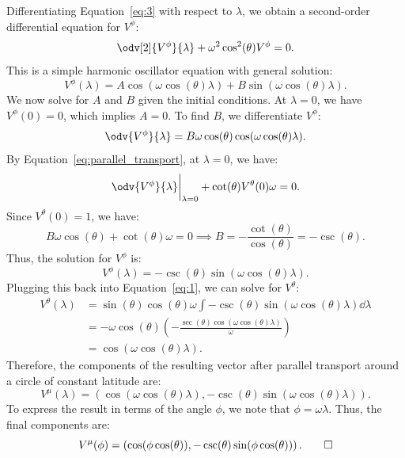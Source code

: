 \begin{solution}[(ii)]
\begin{equation}
  \end{equation}
  Differentiating Equation~\eqref{eq:3} with respect to $\lambda$, we obtain a second-order differential equation for $V^\phi$:
  \[%
    \odv[2]{V^\phi}{\lambda} + \omega^2\cos^2(\theta) V^\phi = 0
  .\]%
  This is a simple harmonic oscillator equation with general solution:
  \[%
    V^\phi(\lambda) = A \cos(\omega \cos(\theta) \lambda) + B \sin(\omega \cos(\theta) \lambda)
  .\]%
  We now solve for $A$ and $B$ given the initial conditions. At $\lambda = 0$, we have $V^\phi(0) = 0$, which implies $A = 0$. To find $B$, we differentiate $V^\phi$:
  \[%
    \odv{V^\phi}{\lambda} = B \omega \cos(\theta) \cos(\omega \cos(\theta) \lambda)
  .\]%
  By Equation~\eqref{eq:parallel_transport}, at $\lambda = 0$, we have:
  \[%
    \odv{V^\phi}{\lambda}\bigg|_{\lambda=0} + \cot(\theta) V^\theta(0) \omega = 0
  .\]%
  Since $V^\theta(0) = 1$, we have:
  \[%
    B \omega \cos(\theta) + \cot(\theta) \omega = 0 \implies B = -\frac{\cot(\theta)}{\cos(\theta)} = -\csc(\theta)
  .\]%
  Thus, the solution for $V^\phi$ is:
  \[%
    V^\phi(\lambda) = -\csc(\theta) \sin(\omega \cos(\theta) \lambda)
  .\]%
  Plugging this back into Equation~\eqref{eq:1}, we can solve for $V^\theta$:
  \begin{align*}
    V^\theta(\lambda) &= \sin(\theta)\cos(\theta) \omega \int -\csc(\theta) \sin(\omega \cos(\theta) \lambda) \dd{\lambda} \\
                      &= -\omega\cos(\theta) \left(-\frac{\sec(\theta)\cos(\omega \cos(\theta) \lambda)}{\omega}\right) \\
                      &= \cos(\omega \cos(\theta) \lambda)
  .\end{align*}
  Therefore, the components of the resulting vector after parallel transport around a circle of constant latitude are:
  \[%
    V^\mu(\lambda) = \left(\cos(\omega \cos(\theta) \lambda), -\csc(\theta) \sin(\omega \cos(\theta) \lambda)\right)
  .\]%
  To express the result in terms of the angle $\phi$, we note that $\phi = \omega \lambda$. Thus, the final components are:
  \[%
    V^\mu(\phi) = \left(\cos(\phi \cos(\theta)), -\csc(\theta) \sin(\phi \cos(\theta))\right)
  .\qedhere\]%
\end{solution}

